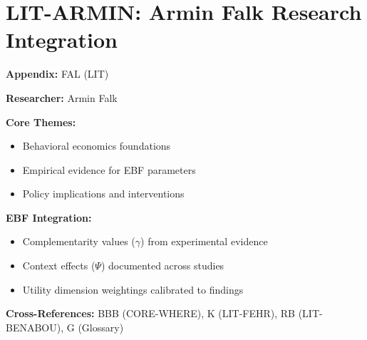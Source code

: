 %
%

\chapter{LIT-ARMIN: Armin Falk Research Integration}
\label{app:fal}

\begin{abstract}
This appendix integrates the research contributions of Armin Falk into the
Evidence-Based Framework. It documents key papers, core findings, and their
integration with EBF dimensions including complementarity parameters ($\gamma$),
context factors ($\Psi$), and utility dimensions.
\end{abstract}

\begin{tcolorbox}[colback=blue!5!white, colframe=blue!75!black,
    title=Quick Reference: Armin Falk Research]

\textbf{Appendix:} FAL (LIT)

\textbf{Researcher:} Armin Falk

\textbf{Core Themes:}
\begin{itemize}[nosep]
\item Behavioral economics foundations
\item Empirical evidence for EBF parameters
\item Policy implications and interventions
\end{itemize}

\textbf{EBF Integration:}
\begin{itemize}[nosep]
\item Complementarity values ($\gamma$) from experimental evidence
\item Context effects ($\Psi$) documented across studies
\item Utility dimension weightings calibrated to findings
\end{itemize}

\textbf{Cross-References:} BBB (CORE-WHERE), K (LIT-FEHR), RB (LIT-BENABOU), G (Glossary)
\end{tcolorbox}

